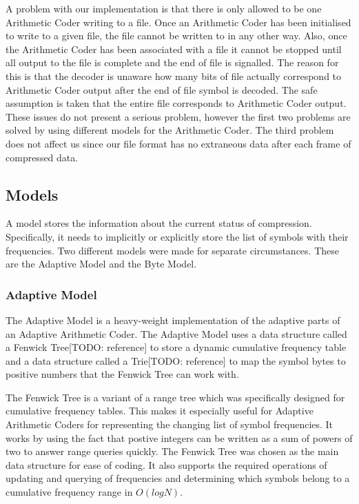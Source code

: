 \documentclass[a4paper,11pt]{report}
\begin{document}
A problem with our implementation is that there is only allowed to be one Arithmetic Coder writing to a file. Once an Arithmetic Coder has been initialised to write to a given file, the file cannot be written to in any other way. Also, once the Arithmetic Coder has been associated with a file it cannot be stopped until all output to the file is complete and the end of file is signalled. The reason for this is that the decoder is unaware how many bits of file actually correspond to Arithmetic Coder output after the end of file symbol is decoded. The safe assumption is taken that the entire file corresponds to Arithmetic Coder output. These issues do not present a serious problem, however the first two problems are solved by using different models for the Arithmetic Coder. The third problem does not affect us since our file format has no extraneous data after each frame of compressed data.

\subsection{Models}

A model stores the information about the current status of compression. Specifically, it needs to implicitly or explicitly store the list of symbols with their frequencies. Two different models were made for separate circumstances. These are the Adaptive Model and the Byte Model.

\subsubsection{Adaptive Model}

The Adaptive Model is a heavy-weight implementation of the adaptive parts of an Adaptive Arithmetic Coder. The Adaptive Model uses a data structure called a Fenwick Tree[TODO: reference] to store a dynamic cumulative frequency table and a data structure called a Trie[TODO: reference] to map the symbol bytes to positive numbers that the Fenwick Tree can work with.

The Fenwick Tree is a variant of a range tree which was specifically designed for cumulative frequency tables. This makes it especially useful for Adaptive Arithmetic Coders for representing the changing list of symbol frequencies. It works by using the fact that postive integers can be written as a sum of powers of two to answer range queries quickly. The Fenwick Tree was chosen as the main data structure for ease of coding. It also supports the required operations of updating and querying of frequencies and determining which symbols belong to a cumulative frequency range in $O(logN)$. 
\end{document}
